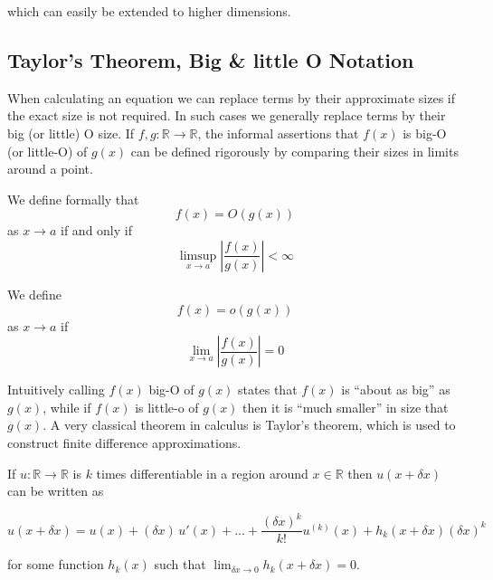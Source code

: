 \documentclass[../main.tex]{subfiles}
\begin{document}
  which can easily be extended to higher dimensions.

  \subsection{Taylor's Theorem,  Big \& little O Notation}
  When calculating an equation we can replace terms by their approximate sizes if the exact size is not required. In such cases we generally replace terms by their big (or little) O size. If $f, g : \mathbb{R} \to \mathbb{R}$, the informal assertions that $f(x)$ is big-O (or little-O) of $g(x)$ can be defined rigorously by comparing their sizes in limits around a point.

  \begin{definition}[Big O]
    We define formally that
    \begin{equation}
      f(x) = O(g(x))
    \end{equation}
    as $x \to a$ if and only if
    \begin{equation}
      \limsup_{x \to a} \left\vert \frac{f(x)}{g(x)} \right\vert < \infty
    \end{equation}
  \end{definition}

  \begin{definition}[Little O]
    We define
    \begin{equation}
      f(x) = o(g(x))
    \end{equation}
    as $x \to a$ if
    \begin{equation}
      \lim_{x \to a} \left\vert \frac{f(x)}{g(x)} \right\vert = 0
    \end{equation}
  \end{definition}

  Intuitively calling $f(x)$ big-O of $g(x)$ states that $f(x)$ is ``about as big'' as $g(x)$, while if $f(x)$ is little-o of $g(x)$ then it is ``much smaller'' in size that $g(x)$. A very classical theorem in calculus is Taylor's theorem, which is used to construct finite difference approximations.

  \begin{theorem}[Taylor]
    If $u : \mathbb{R} \to \mathbb{R}$ is $k$ times differentiable in a region around $x \in \mathbb{R}$ then $u(x + \delta x)$ can be written as

    \begin{equation} \label{diff:eq:taylor}
      u(x + \delta x) = u(x) + (\delta x) \, u'(x) + ... + \frac{(\delta x)^k}{k!} u^{(k)}(x) + h_k(x + \delta x) (\delta x)^k
    \end{equation}

    for some function $h_k(x)$ such that $\lim_{\delta x \to 0} h_k(x + \delta x) = 0$.
  \end{theorem}
\end{document}
